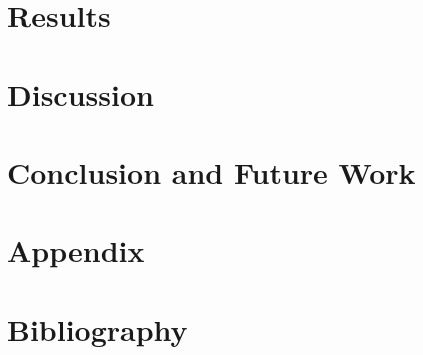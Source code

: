 \documentclass[acmlarge,screen]{acmart}
\begin{document}
\newpage
\section{Results}






\newpage
\section{Discussion}

\newpage
\section{Conclusion and Future Work}

\newpage
\section{Appendix}
\appendix




\newpage
\section{Bibliography}


\newpage
\end{document}
